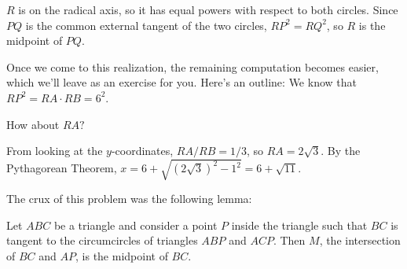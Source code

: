 




$R$ is on the radical axis, so it has equal powers with respect to both circles. Since $PQ$ is the common external tangent of the two circles, $RP^2 = RQ^2$, so $R$ is the midpoint of $PQ$.

Once we come to this realization, the remaining computation becomes easier, which we'll leave as an exercise for you. Here's an outline: We know that $RP^2 = RA\cdot RB = 6^2$.

How about $RA?$


From looking at the $y$-coordinates, $RA/RB = 1/3$, so $RA = 2\sqrt3$. By the Pythagorean Theorem, $x = 6+\sqrt{(2\sqrt3)^2 - 1^2} = 6+\sqrt{11}$.

The crux of this problem was the following lemma:

\begin{lemma}
    Let $ABC$ be a triangle and consider a point $P$ inside the triangle such that $BC$ is tangent to the circumcircles of triangles $ABP$ and $ACP$. Then $M$, the intersection of $BC$ and $AP$, is the midpoint of $BC$.    
\end{lemma}




